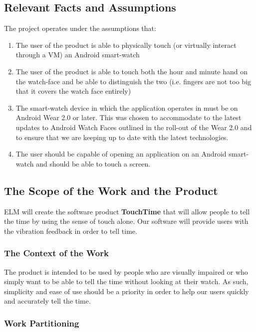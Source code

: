 \documentclass[12pt, titlepage]{article}
\begin{document}
\subsection{Relevant Facts and Assumptions}
The project operates under the assumptions that:
\vspace{2mm}

\begin{enumerate}
\item The user of the product is able to physically touch (or virtually interact through a VM) an Android smart-watch
\item The user of the product is able to touch both the hour and minute hand on the watch-face and be able to distinguish the two (i.e. fingers are not too big that it covers the watch face entirely)
\item The smart-watch device in which the application operates in must be on Android Wear 2.0 or later. This was chosen to accommodate to the latest updates to Android Watch Faces outlined in the roll-out of the Wear 2.0 and to ensure that we are keeping up to date with the latest technologies.
\item The user should be capable of opening an application on an Android smart-watch and should be able to touch a screen.
\end{enumerate}

\subsection{The Scope of the Work and the Product}

ELM will create the software product \textbf{TouchTime} that will allow people to tell the time by using the sense of touch alone. Our software will provide users with the vibration feedback in order to tell time. 

\subsubsection{The Context of the Work}

The product is intended to be used by people who are visually impaired or who simply want to be able to tell the time without looking at their watch. As such, simplicity and ease of use should be a priority in order to help our users quickly and accurately tell the time.

\subsubsection{Work Partitioning}
\end{document}

